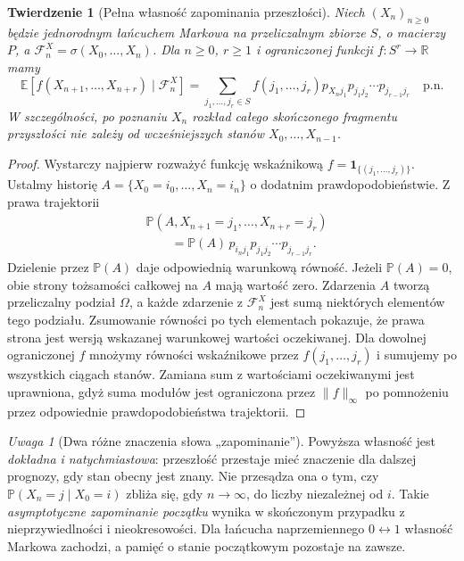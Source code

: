 \documentclass[11pt,a4paper,oneside]{report}
\numberwithin{equation}{chapter}
\theoremstyle{plain}
\newtheorem{twierdzenie}{Twierdzenie}[chapter]
\theoremstyle{definition}
\theoremstyle{remark}
\newtheorem{uwaga}{Uwaga}[chapter]
\newcommand{\R}{\mathbb{R}}
\newcommand{\Prob}{\mathbb{P}}
\newcommand{\E}{\mathbb{E}}
\newcommand{\ind}[1]{\mathbf{1}_{#1}}
\begin{document}
\begin{twierdzenie}[Pełna własność zapominania przeszłości]
Niech $(X_n)_{n\geq0}$ będzie jednorodnym łańcuchem
Markowa na przeliczalnym zbiorze $S$, o macierzy $P$,
a $\mathcal F_n^X=\sigma(X_0,\ldots,X_n)$. Dla
$n\geq0$, $r\geq1$ i ograniczonej funkcji
$f:S^r\to\R$ mamy
\[
\E[f(X_{n+1},\ldots,X_{n+r})\mid\mathcal F_n^X]
=\sum_{j_1,\ldots,j_r\in S} f(j_1,\ldots,j_r)
 p_{X_nj_1}p_{j_1j_2}\cdots p_{j_{r-1}j_r}
\quad\text{p.n.}
\]
W szczególności, po poznaniu $X_n$ rozkład
\emph{całego skończonego fragmentu przyszłości}
nie zależy od wcześniejszych stanów $X_0,\ldots,X_{n-1}$.
\end{twierdzenie}
\begin{proof}
Wystarczy najpierw rozważyć funkcję wskaźnikową
$f=\ind{\{(j_1,\ldots,j_r)\}}$. Ustalmy historię
$A=\{X_0=i_0,\ldots,X_n=i_n\}$ o dodatnim
prawdopodobieństwie. Z prawa trajektorii
\begin{align*}
&\Prob(A, X_{n+1}=j_1,\ldots,X_{n+r}=j_r)\\
&\qquad=\Prob(A)\,p_{i_nj_1}p_{j_1j_2}\cdots
p_{j_{r-1}j_r}.
\end{align*}
Dzielenie przez $\Prob(A)$ daje odpowiednią
warunkową równość. Jeżeli $\Prob(A)=0$, obie
strony tożsamości całkowej na $A$ mają wartość zero.
Zdarzenia $A$ tworzą przeliczalny podział $\Omega$,
a każde zdarzenie z $\mathcal F_n^X$ jest sumą
niektórych elementów tego podziału. Zsumowanie
równości po tych elementach pokazuje, że prawa
strona jest wersją wskazanej warunkowej wartości
oczekiwanej. Dla dowolnej ograniczonej $f$ mnożymy
równości wskaźnikowe przez $f(j_1,\ldots,j_r)$
i sumujemy po wszystkich ciągach stanów.
Zamiana sum z wartościami oczekiwanymi jest
uprawniona, gdyż suma modułów jest ograniczona
przez $\|f\|_\infty$ po pomnożeniu przez
odpowiednie prawdopodobieństwa trajektorii.
\end{proof}

\begin{uwaga}[Dwa różne znaczenia słowa „zapominanie”]
Powyższa własność jest \emph{dokładna i natychmiastowa}:
przeszłość przestaje mieć znaczenie dla dalszej prognozy,
gdy stan obecny jest znany. Nie przesądza ona o tym,
czy $\Prob(X_n=j\mid X_0=i)$ zbliża się, gdy
$n\to\infty$, do liczby niezależnej od $i$.
Takie \emph{asymptotyczne zapominanie początku}
wynika w skończonym przypadku z nieprzywiedlności
i nieokresowości. Dla łańcucha naprzemiennego
$0\leftrightarrow1$ własność Markowa zachodzi,
a pamięć o stanie początkowym pozostaje na zawsze.
\end{uwaga}
\end{document}
